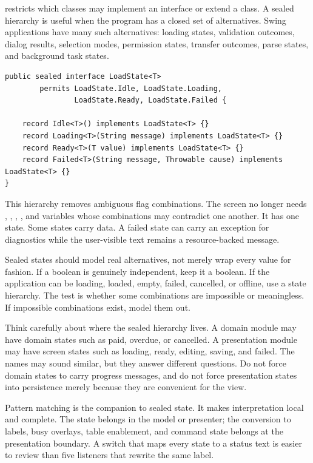  restricts which classes may implement an interface or extend a class. A sealed hierarchy is useful when the program has a closed set of alternatives. Swing applications have many such alternatives: loading states, validation outcomes, dialog results, selection modes, permission states, transfer outcomes, parse states, and background task states.

\begin{lstlisting}[caption={A finite set of load states.}]
public sealed interface LoadState<T>
        permits LoadState.Idle, LoadState.Loading,
                LoadState.Ready, LoadState.Failed {

    record Idle<T>() implements LoadState<T> {}
    record Loading<T>(String message) implements LoadState<T> {}
    record Ready<T>(T value) implements LoadState<T> {}
    record Failed<T>(String message, Throwable cause) implements LoadState<T> {}
}
\end{lstlisting}

This hierarchy removes ambiguous flag combinations. The screen no longer needs , , , , and  variables whose combinations may contradict one another. It has one state. Some states carry data. A failed state can carry an exception for diagnostics while the user-visible text remains a resource-backed message.

Sealed states should model real alternatives, not merely wrap every value for fashion. If a boolean is genuinely independent, keep it a boolean. If the application can be loading, loaded, empty, failed, cancelled, or offline, use a state hierarchy. The test is whether some combinations are impossible or meaningless. If impossible combinations exist, model them out.

Think carefully about where the sealed hierarchy lives. A domain module may have domain states such as paid, overdue, or cancelled. A presentation module may have screen states such as loading, ready, editing, saving, and failed. The names may sound similar, but they answer different questions. Do not force domain states to carry progress messages, and do not force presentation states into persistence merely because they are convenient for the view.

Pattern matching is the companion to sealed state. It makes interpretation local and complete. The state belongs in the model or presenter; the conversion to labels, busy overlays, table enablement, and command state belongs at the presentation boundary. A switch that maps every state to a status text is easier to review than five listeners that rewrite the same label.

